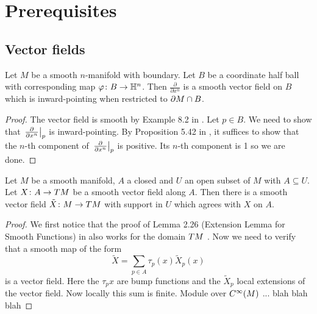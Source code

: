\section{Prerequisites}

\subsection{Vector fields}

\begin{lem}\label{lem:ballinward}
    Let $M$ be a smooth $n$-manifold with boundary. Let $B$ be a coordinate half ball with corresponding map $\varphi \colon B \to \mathbb{H}^n$. 
    Then $\frac{\partial}{\partial x^n}$ is a smooth vector field on $B$ which is inward-pointing when restricted to $\partial M \cap B$.
\end{lem}
\begin{proof}
    The vector field is smooth by Example 8.2 in \cite{Lee2006}. 
    Let $p \in B$. 
    We need to show that $\left.\frac{\partial}{\partial x^n}\right|_{p}$ is inward-pointing. 
    By Proposition 5.42 in \cite{Lee2006}, it suffices to show that the $n$-th component of $\left.\frac{\partial}{\partial x^n}\right|_{p}$ is positive. 
    Its $n$-th component is 1 so we are done. 
\end{proof}

\begin{lem}\label{lem:vecfieldextension}
    Let $M$ be a smooth manifold, $A$ a closed and $U$ an open subset of $M$ with $A \subseteq U$. 
    Let $X \colon A \to TM$ be a smooth vector field along $A$.
    Then there is a smooth vector field $\tilde{X} \colon M \to TM$ with support in $U$ which agrees with $X$ on $A$. 
\end{lem}

\begin{proof}
    We first notice that the proof of Lemma 2.26 (Extension Lemma for Smooth Functions) in \cite{Lee2006} also works for the domain $TM$ . 
    Now we need to verify that a smooth map of the form 
    \begin{equation*}
        \tilde{X} = \sum_{p \in A} \tau_p (x) \tilde{X}_p (x)
    \end{equation*}
    is a vector field.
    Here the $\tau_p{x}$ are bump functions and the $\tilde{X}_p$ local extensions of the vector field. 
    Now locally this sum is finite. 
    Module over $C^\infty(M)$ ... blah blah blah
\end{proof}

